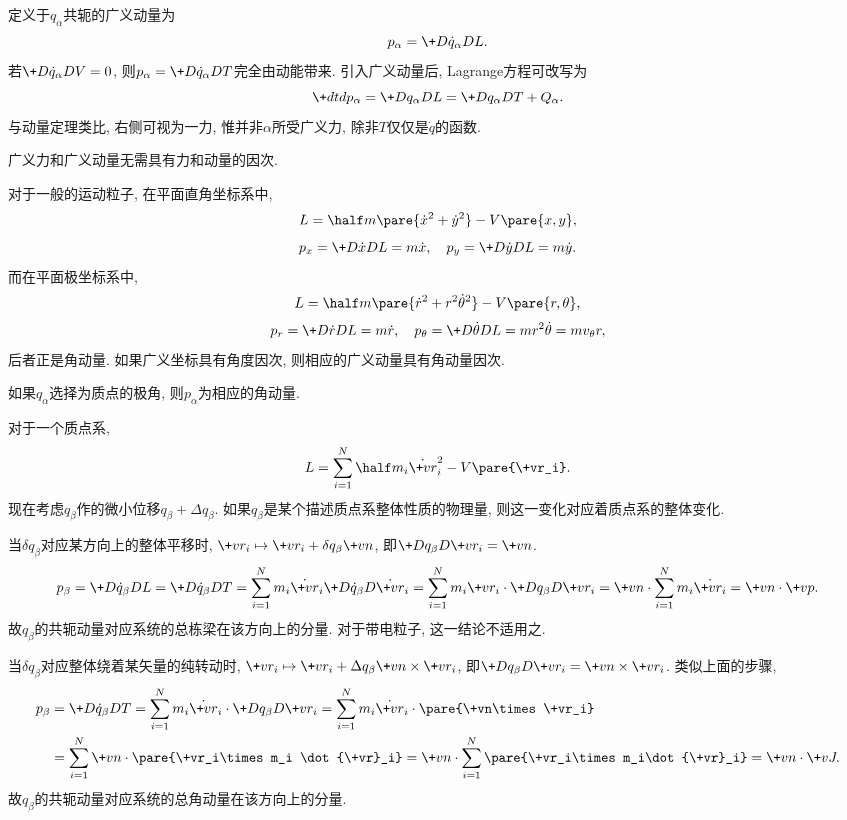 \documentclass[../LectureNotes.tex]{subfiles}
\begin{document}
定义于$q_\alpha$共轭的广义动量为
\[ p_\alpha = \+D{\dot{q}_\alpha}DL. \]
若$\displaystyle \+D{\dot{q}_\alpha}DV = 0$, 则$\displaystyle p_\alpha = \+D{\dot{q}_\alpha}DT$完全由动能带来. 引入广义动量后, Lagrange方程可改写为
\[ \+dtd{p_\alpha} = \+D{q_\alpha}DL = \+D{q_\alpha}DT + Q_\alpha. \]
与动量定理类比, 右侧可视为一力, 惟并非$\alpha$所受广义力, 除非$T$仅仅是$\dot{q}$的函数.
\begin{pitfall}
    广义力和广义动量无需具有力和动量的因次.
\end{pitfall}
\begin{sample}
    \begin{ex}
        对于一般的运动粒子, 在平面直角坐标系中,
        \[ L = \half m\pare{\dot{x}^2 + \dot{y}^2} - V\pare{x,y}, \]
        \[ p_x = \+D{\dot{x}}DL = m\dot{x},\quad p_y = \+D{\dot{y}}DL = m\dot{y}. \]
        而在平面极坐标系中,
        \[ L = \half m\pare{\dot{r}^2 + r^2\dot{\theta}^2} - V\pare{r,\theta}, \]
        \[ p_r = \+D{\dot{r}}DL = m\dot{r},\quad p_\theta = \+D{\dot{\theta}}DL = mr^2\dot{\theta} = mv_{\theta}r, \]
        后者正是角动量. 如果广义坐标具有角度因次, 则相应的广义动量具有角动量因次.
    \end{ex}
\end{sample}
\begin{lemma}
    如果$q_\alpha$选择为质点的极角, 则$p_\alpha$为相应的角动量.
\end{lemma}
对于一个质点系,
\[ L = \sum_{i=1}^N \half m_i \dot{\+vr}_i^2 - V\pare{\+vr_i}. \]
现在考虑$q_\beta$作的微小位移$q_\beta+\Delta q_\beta$. 如果$q_\beta$是某个描述质点系整体性质的物理量, 则这一变化对应着质点系的整体变化.
\begin{cenum}
    \item 当$\delta q_\beta$对应某方向上的整体平移时, $\+vr_i \mapsto \+vr_i + \delta q_\beta \+vn$, 即$\displaystyle \+D{q_\beta}D{\+vr_i} = \+vn$.
    \[ p_\beta = \+D{\dot{q}_\beta}DL = \+D{\dot{q}_\beta}DT = \sum_{i=1}^N m_i\dot{\+vr}_i\+D{\dot{q}_\beta}D{\dot{\+vr}_i} = \sum_{i=1}^N m_i\+vr_i\cdot\+D{q_\beta}D{\+vr_i} = \+vn\cdot\sum_{i=1}^N m_i \dot{\+vr_i} = \+vn\cdot \+vp. \]
    故$q_\beta$的共轭动量对应系统的总栋梁在该方向上的分量. 对于带电粒子, 这一结论不适用之.
    \item 当$\delta q_\beta$对应整体绕着某矢量的纯转动时, $\+vr_i \mapsto \+vr_i + \Delta q_\beta \+vn\times\+vr_i$, 即$\displaystyle \+D{q_\beta}D{\+vr_i} = \+vn\times\+vr_i$. 类似上面的步骤,
    \begin{align*}
         p_\beta &= \+D{\dot{q}_\beta}D{T} = \sum_{i=1}^N m_i\dot{\+vr}_i\cdot\+D{q_\beta}D{\+vr_i} = \sum_{i=1}^N m_i \dot{\+vr}_i\cdot\pare{\+vn\times\+vr_i} \\
         &= \sum_{i=1}^N \+vn\cdot\pare{\+vr_i\times m_i \dot{\+vr}_i} = \+vn\cdot\sum_{i=1}^N\pare{\+vr_i\times m_i\dot{\+vr}_i} = \+vn\cdot\+vJ.
    \end{align*}
    故$q_\beta$的共轭动量对应系统的总角动量在该方向上的分量.
\end{cenum}
\end{document}
